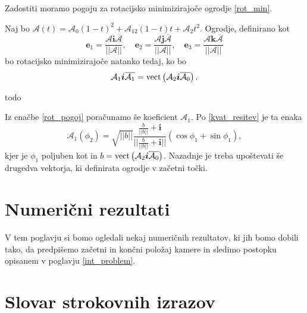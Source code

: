 \documentclass[mat1]{fmfdelo}
\newcommand{\ii}{\boldsymbol i}
\newcommand{\jj}{\boldsymbol j}
\newcommand{\kk}{\boldsymbol k}
\newcommand{\e}{\boldsymbol e}
\newcommand{\A}{\mathcal A}
\begin{document}
	Zadostiti moramo pogoju za rotacijsko minimizirajoče ogrodje \ref{rot_min}.
	\begin{trditev} Naj bo $\A(t) = \A_0(1-t)^2 + \A_12(1-t)t+\A_2t^2$.
		Ogrodje, definirano kot
		\begin{equation*}
			\e_1 = \frac{\A \ii \overline{\A}}{||\A||},\quad \e_2= \frac{\A \jj \overline{\A}}{||\A||}, \quad \e_3 = \frac{\A \kk \overline{\A}}{||\A||}
		\end{equation*}
		bo rotacijsko minimizirajoče natanko tedaj, ko bo
		\begin{equation}{\label{rot_pogoj}}
			\A_1 \ii \overline{\A_1} = {\rm vect} \left(\A_2 \ii \overline{\A_0}\right).
		\end{equation}
	\end{trditev}
\begin{dokaz}
	todo
\end{dokaz}
Iz enačbe \ref{rot_pogoj} poračunamo še koeficient $\A_1$. Po \ref{kvat_resitev} je ta enaka
\begin{equation}
	\A_1(\phi_2) = \sqrt{||b||} \frac{\frac{b}{||b||}+ \ii}{||\frac{b}{||b||}+ \ii||} \left(\cos \phi_1 + \sin \phi_1\right),
\end{equation}
kjer je $\phi_1$ poljuben kot in $b = {\rm vect} \left(\A_2 \ii \overline{\A_0}\right)$.
Nazadnje je treba upoštevati še drugedva vektorja, ki definirata ogrodje v začetni točki. 



\section{Numerični rezultati}
V tem poglavju si bomo ogledali nekaj numeričnih rezultatov, ki jih bomo dobili tako, da predpišemo začetni in končni položaj kamere in sledimo postopku opisanem v poglavju \ref{int_problem}.


\section*{Slovar strokovnih izrazov}

\geslo{}{}
\geslo{}{}

\begin{thebibliography}{99}


\end{thebibliography}
\end{document}
